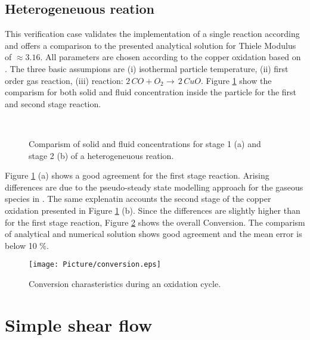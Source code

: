 \documentclass{particles2015}
\begin{document}
\subsection{Heterogeneuous reation}
\label{sec:heterogeneuous_reaction}

This verification case validates the implementation of a single reaction according \cite{Wen} and offers a comparison to the presented analytical solution for Thiele Modulus of $\approx 3.16$. All parameters are chosen according to the copper oxidation based on \cite{Noorman2011}. The three basic assumpions are (i) isothermal particle temperature, (ii) first order gas reaction, (iii) reaction: $2 \, CO + O_2 \rightarrow \, 2\, CuO$. Figure \ref{fig:reaction_stages} show the comparism for both solid and fluid concentration inside the particle for the first and second stage reaction.

\begin{figure}[h!]
\centering
{}
\hspace{0.3cm}
\\
\caption{Comparism of solid and fluid concentrations for stage 1 (a) and stage 2 (b) of a heterogeneuous reation.}
\label{fig:reaction_stages}
\end{figure}

Figure \ref{fig:reaction_stages} (a) shows a good agreement for the first stage reaction. Arising differences are due to the pseudo-steady state modelling approach for the gaseous species in \cite{Noorman2011}. The same explenatin accounts the second stage of the copper oxidation presented in Figure \ref{fig:reaction_stages} (b). Since the differences are slightly higher than for the first stage reaction, Figure \ref{fig:Conversion} shows the overall Conversion. The comparism of analytical and numerical solution shows good agreement and the mean error is below 10 $\%$.  

\begin{figure}[h!]
   \centering
   \texttt{[image: Picture/conversion.eps]}
   \caption{Conversion charasteristics during an oxidation cycle.}
   \label{fig:Conversion}
\end{figure}


\newpage
\section{Simple shear flow}
\label{sec:simple_shear}
\end{document}

